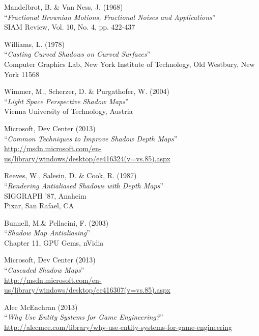\begin{thebibliography}{9}

	Mandelbrot, B. \& Van Ness, J. (1968) \\ 
	``\textit{Fractional Brownian Motions, Fractional Noises and Applications}'' \\
	SIAM Review, Vol. 10, No. 4, pp. 422-437
	
	Williams, L. (1978) \\ 
	``\textit{Casting Curved Shadows on Curved Surfaces}'' \\
	Computer Graphics Lab, New York Institute of Technology, Old Westbury, New York 11568 
	
	Wimmer, M., Scherzer, D. \& Purgathofer, W. (2004) \\ 
	``\textit{Light Space Perspective Shadow Maps}'' \\
	Vienna University of Technology, Austria
	
	Microsoft, Dev Center (2013) \\ 
	``\textit{Common Techniques to Improve Shadow Depth Maps}'' \\
	\href{http://msdn.microsoft.com/en-us/library/windows/desktop/ee416324(v=vs.85).aspx}{http://msdn.microsoft.com/en-us/library/windows/desktop/ee416324(v=vs.85).aspx}
		
	Reeves, W., Salesin, D. \& Cook, R. (1987) \\ 
	``\textit{Rendering Antialiased Shadows with Depth Maps}'' \\
	SIGGRAPH '87, Anaheim \\
	Pixar, San Rafael, CA 

	Bunnell, M.\& Pellacini, F. (2003) \\ 
	``\textit{Shadow Map Antialiasing}'' \\
	Chapter 11, GPU Gems, nVidia
	
	Microsoft, Dev Center (2013) \\ 
	``\textit{Cascaded Shadow Maps}'' \\
	\href{http://msdn.microsoft.com/en-us/library/windows/desktop/ee416307(v=vs.85).aspx}{http://msdn.microsoft.com/en-us/library/windows/desktop/ee416307(v=vs.85).aspx}
	
	Alec McEachran (2013) \\ 
	``\textit{Why Use Entity Systems for Game Engineering?}'' \\
	\href{http://alecmce.com/library/why-use-entity-systems-for-game-engineering}{http://alecmce.com/library/why-use-entity-systems-for-game-engineering}	


\end{thebibliography}
